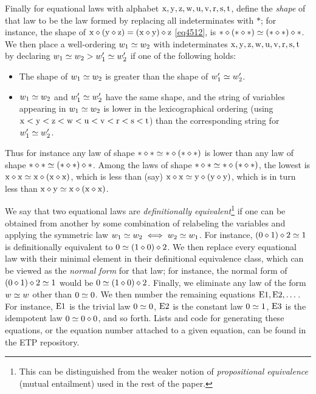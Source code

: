 Finally for equational laws with alphabet $\mathrm{x},\mathrm{y},\mathrm{z},\mathrm{w},\mathrm{u},\mathrm{v},\mathrm{r},\mathrm{s},\mathrm{t}$, define the \emph{shape} of that law to be the law formed by replacing all indeterminates with $\ast$; for instance, the shape of $\mathrm{x} \diamond (\mathrm{y} \diamond \mathrm{z}) = (\mathrm{x} \diamond \mathrm{y}) \diamond \mathrm{z}$ \eqref{eq4512}, is $\ast \diamond (\ast \diamond \ast) \simeq (\ast \diamond \ast) \diamond \ast$.  We then place a well-ordering $w_1 \simeq w_2$ with indeterminates $\mathrm{x},\mathrm{y},\mathrm{z},\mathrm{w},\mathrm{u},\mathrm{v},\mathrm{r},\mathrm{s},\mathrm{t}$ by declaring $w_1 \simeq w_2 > w'_1 \simeq w'_2$ if one of the following holds:
\begin{itemize}
\item The shape of $w_1 \simeq w_2$ is greater than the shape of $w'_1 \simeq w'_2$.
\item $w_1 \simeq w_2$ and $w'_1 \simeq w'_2$ have the same shape, and the string of variables appearing in $w_1 \simeq w_2$ is lower in the lexicographical ordering (using $\mathrm{x} < \mathrm{y} < \mathrm{z} < \mathrm{w} < \mathrm{u} < \mathrm{v} < \mathrm{r} < \mathrm{s} < \mathrm{t}$) than the corresponding string for $w'_1 \simeq w'_2$.
\end{itemize}
Thus for instance any law of shape $\ast \diamond \ast \simeq \ast \diamond (\ast \diamond \ast)$ is lower than any law of shape
$\ast \diamond \ast \simeq (\ast \diamond \ast) \diamond \ast$.  Among the laws of shape $\ast \diamond \ast \simeq \ast \diamond (\ast \diamond \ast)$, the lowest is $\mathrm{x} \diamond \mathrm{x} \simeq \mathrm{x} \diamond (\mathrm{x} \diamond \mathrm{x})$, which is less than (say) $\mathrm{x} \diamond \mathrm{x} \simeq \mathrm{y} \diamond (\mathrm{y} \diamond \mathrm{y})$, which is in turn less than $\mathrm{x} \diamond \mathrm{y} \simeq \mathrm{x} \diamond (\mathrm{x} \diamond \mathrm{x})$.

We say that two equational laws are \emph{definitionally equivalent}\footnote{This can be distinguished from the weaker notion of \emph{propositional equivalence} (mutual entailment) used in the rest of the paper.} if one can be obtained from another by some combination of relabeling the variables and applying the symmetric law $w_1 \simeq w_2 \iff w_2 \simeq w_1$.  For instance, $(0 \diamond 1) \diamond 2 \simeq 1$ is definitionally equivalent to $0 \simeq (1 \diamond 0) \diamond 2$.  We then replace every equational law with their minimal element in their definitional equivalence class, which can be viewed as the \emph{normal form} for that law; for instance, the normal form of $(0 \diamond 1) \diamond 2 \simeq 1$ would be $0 \simeq (1 \diamond 0) \diamond 2$.  Finally, we eliminate any law of the form $w \simeq w$ other than $0 \simeq 0$.  We then number the remaining equations $\mathrm{E}1, \mathrm{E}2, \dots$.  For instance, $\mathrm{E}1$ is the trivial law $0 \simeq 0$, $\mathrm{E}2$ is the constant law $0 \simeq 1$, $\mathrm{E}3$ is the idempotent law $0 \simeq 0 \diamond 0$, and so forth.  Lists and code for generating these equations, or the equation number attached to a given equation, can be found in the ETP repository.


